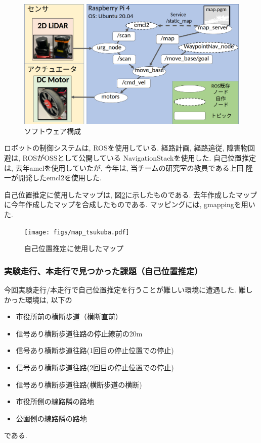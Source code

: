 \documentclass[twocolumn,9pt]{jsproceedings}
\begin{document}
\begin{figure}[h]
  \begin{center}
    \includegraphics[width=1.0\linewidth]{figs/software.pdf}
    \caption{ソフトウェア構成}
    \label{fig:software}
  \end{center}
\end{figure}

ロボットの制御システムは, ROSを使用している. 
経路計画, 経路追従, 障害物回避は, ROSがOSSとして公開している
NavigationStackを使用した. 
自己位置推定は, 去年amclを使用していたが, 
今年は, 当チームの研究室の教員である上田 隆一が開発したemcl2を使用した. 

自己位置推定に使用したマップは, 図\ref{fig:map_tsukuba}に示したものである.
去年作成したマップに今年作成したマップを合成したものである. マッピングには, gmappingを用いた. 

\begin{figure}[h]
  \begin{center}
    \texttt{[image: figs/map\_tsukuba.pdf]}
    \caption{自己位置推定に使用したマップ}
    \label{fig:map_tsukuba}
  \end{center}
\end{figure}

\subsubsection{実験走行、本走行で見つかった課題（自己位置推定）}

今回実験走行/本走行で自己位置推定を行うことが難しい環境に遭遇した. 
難しかった環境は, 以下の
\begin{itemize}
  \item 市役所前の横断歩道（横断直前）
  \item 信号あり横断歩道往路の停止線前の20m
  \item 信号あり横断歩道往路(1回目の停止位置での停止)
  \item 信号あり横断歩道往路(2回目の停止位置での停止)
  \item 信号あり横断歩道往路(横断歩道の横断)
  \item 市役所側の線路隣の路地
  \item 公園側の線路隣の路地
\end{itemize}
である. 
\end{document}
